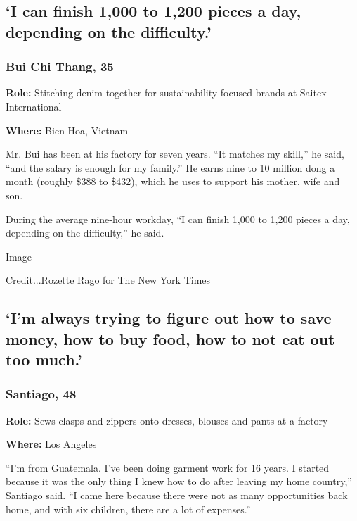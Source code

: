 \hypertarget{i-can-finish-1000-to-1200-pieces-a-day-depending-on-the-difficulty}{%
\subsection{`I can finish 1,000 to 1,200 pieces a day, depending on the
difficulty.'}\label{i-can-finish-1000-to-1200-pieces-a-day-depending-on-the-difficulty}}

\hypertarget{bui-chi-thang-35}{%
\subsubsection{Bui Chi Thang, 35}\label{bui-chi-thang-35}}

\textbf{Role:} Stitching denim together for sustainability-focused
brands at Saitex International

\textbf{Where:} Bien Hoa, Vietnam

Mr. Bui has been at his factory for seven years. ``It matches my
skill,'' he said, ``and the salary is enough for my family.'' He earns
nine to 10 million dong a month (roughly \$388 to \$432), which he uses
to support his mother, wife and son.

During the average nine-hour workday, ``I can finish 1,000 to 1,200
pieces a day, depending on the difficulty,'' he said.

Image

Credit...Rozette Rago for The New York Times

\hypertarget{im-always-trying-to-figure-out-how-to-save-money-how-to-buy-food-how-to-not-eat-out-too-much}{%
\subsection{`I'm always trying to figure out how to save money, how to
buy food, how to not eat out too
much.'}\label{im-always-trying-to-figure-out-how-to-save-money-how-to-buy-food-how-to-not-eat-out-too-much}}

\hypertarget{santiago-48}{%
\subsubsection{Santiago, 48}\label{santiago-48}}

\textbf{Role:} Sews clasps and zippers onto dresses, blouses and pants
at a factory

\textbf{Where:} Los Angeles

``I'm from Guatemala. I've been doing garment work for 16 years. I
started because it was the only thing I knew how to do after leaving my
home country,'' Santiago said. ``I came here because there were not as
many opportunities back home, and with six children, there are a lot of
expenses.''

